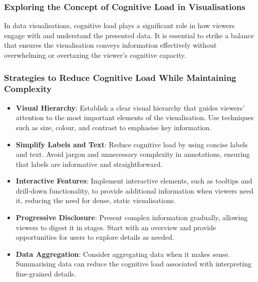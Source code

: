 \documentclass{article}\usepackage[]{graphicx}\usepackage[]{xcolor}
\begin{document}
\subsubsection{Exploring the Concept of Cognitive Load in Visualisations}
In data visualisations, cognitive load plays a significant role in how viewers engage with and understand the presented data. It is essential to strike a balance that ensures the visualisation conveys information effectively without overwhelming or overtaxing the viewer's cognitive capacity.

\subsubsection{Strategies to Reduce Cognitive Load While Maintaining Complexity}
\begin{itemize}
    \item \textbf{Visual Hierarchy}: Establish a clear visual hierarchy that guides viewers' attention to the most important elements of the visualisation. Use techniques such as size, colour, and contrast to emphasise key information.
    \item \textbf{Simplify Labels and Text}: Reduce cognitive load by using concise labels and text. Avoid jargon and unnecessary complexity in annotations, ensuring that labels are informative and straightforward.
    \item \textbf{Interactive Features}: Implement interactive elements, such as tooltips and drill-down functionality, to provide additional information when viewers need it, reducing the need for dense, static visualisations.
    \item \textbf{Progressive Disclosure}: Present complex information gradually, allowing viewers to digest it in stages. Start with an overview and provide opportunities for users to explore details as needed.
    \item \textbf{Data Aggregation}: Consider aggregating data when it makes sense. Summarising data can reduce the cognitive load associated with interpreting fine-grained details.
\end{itemize}
\end{document}
